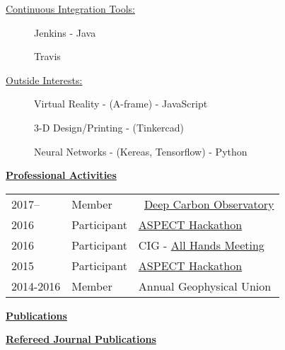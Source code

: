 \documentclass[11pt]{ltxdoc}
\begin{document}
\begin{description}
\begin{description}
    \end{description}
  \item[] \underline{Continuous Integration Tools:}
    \begin{description}
      \item[] Jenkins - Java
      \item[] Travis
    \end{description}
  \item[] \underline{Outside Interests:}
    \begin{description}
      \item[] Virtual Reality - (A-frame) - JavaScript
      \item[] 3-D Design/Printing - (Tinkercad)
      \item[] Neural Networks - (Kereas, Tensorflow) - Python
    \end{description}
\end{description}

\vskip 12pt

\begin{center}
	\textbf{\underline{Professional Activities}}
\end{center}

\vskip -06pt

\addtolength{\tabcolsep}{15pt}   
\begin{tabular}{lll}
  2017--     & Member & ~\href{https://deepcarbon.net/}{Deep Carbon Observatory} \\
  2016     & Participant & \href{https://geodynamics.org/cig/events/calendar/2017-aspect-hack/}{ASPECT Hackathon} \\
  2016     & Participant & CIG - \href{https://geodynamics.org/cig/events/calendar/2016-cig-all-hands-meeting/}{All Hands Meeting} \\
  2015     & Participant & \href{https://geodynamics.org/cig/events/calendar/2016-cig-all-hands-meeting/2016-aspect-hack/?eID=1233}{ASPECT Hackathon}\\
  2014-2016     & Member & Annual Geophysical Union 
\end{tabular}
\addtolength{\tabcolsep}{1pt}  
 
\clearpage

\newpage

\begin{center}
  \textbf{\underline{Publications}}
\end{center}

\noindent
\textbf{\underline{Refereed Journal Publications}}
\end{document}
